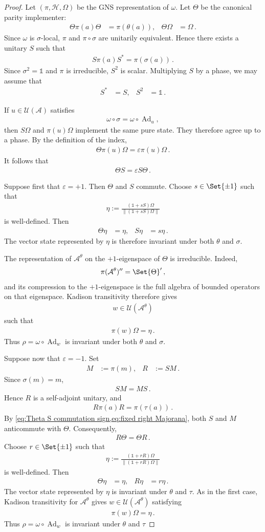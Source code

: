 \documentclass[a4paper,10pt]{article}
\numberwithin{equation}{section}
\theoremstyle{plain}
\theoremstyle{plain}
\theoremstyle{plain}
\theoremstyle{plain}
\theoremstyle{plain}
\theoremstyle{remark}
\theoremstyle{definition}
\newcommand{\calA}{\mathcal{A}}
\newcommand{\calU}{\mathcal{U}}
\newcommand{\calH}{\mathcal{H}}
\newcommand\norm[1]{\left\lVert#1\right\rVert}
\newcommand{\Ad}[1]{\operatorname{Ad}_{#1}}
\newcommand{\Id}{\mathds{1}}
\newcommand{\eq}[1]{\begin{align*}#1\end{align*}}
\newcommand{\eql}[1]{\begin{align}#1\end{align}}
\begin{document}
\begin{proof}
Let \((\pi,\calH,\Omega)\) be the GNS representation of \(\omega\).
Let \(\Theta\) be the canonical parity implementer:
\eq{
    \Theta\pi(a)\Theta
    &=
    \pi(\theta(a)),&
    \Theta\Omega
    &=
    \Omega\,.
}
Since \(\omega\) is \(\sigma\)-local, \(\pi\) and
\(\pi\circ\sigma\) are unitarily equivalent. Hence there exists a
unitary \(S\) such that
\eq{
    S\pi(a)S^*
    =
    \pi(\sigma(a))\,.
}
Since \(\sigma^2=\Id\) and \(\pi\) is irreducible, \(S^2\) is scalar.
Multiplying \(S\) by a phase, we may assume that
\eq{
    S^*
    &=
    S,&
    S^2
    &=
    \Id\,.
}

If \(u\in\calU(\calA)\) satisfies
\eq{
    \omega\circ\sigma
    =
    \omega\circ\Ad{u},
}
then \(S\Omega\) and \(\pi(u)\Omega\) implement the same pure state.
They therefore agree up to a phase. By the definition of the index,
\eq{
    \Theta\pi(u)\Omega
    =
    \varepsilon\pi(u)\Omega\,.
}
It follows that
\eql{
    \Theta S
    =
    \varepsilon S\Theta
    \label{eq:Theta S commutation sign}\,.
}

Suppose first that \(\varepsilon=+1\). Then \(\Theta\) and \(S\)
commute. Choose \(s\in\Set{\pm1}\) such that
\eq{
    \eta
    :=
    \frac{(\Id+sS)\Omega}
    {\norm{(\Id+sS)\Omega}}
}
is well-defined. Then
\eq{
    \Theta\eta
    &=
    \eta,&
    S\eta
    &=
    s\eta\,.
}
The vector state represented by \(\eta\) is therefore invariant under
both \(\theta\) and \(\sigma\).

The representation of \(\calA^\theta\) on the \(+1\)-eigenspace of
\(\Theta\) is irreducible. Indeed,
\eq{
    \pi(\calA^\theta)''
    =
    \Set{\Theta}'\, ,
}
and its compression to the \(+1\)-eigenspace is the full algebra of
bounded operators on that eigenspace. Kadison transitivity therefore
gives
\eq{
    w\in\calU(\calA^\theta)
}
such that
\eq{
    \pi(w)\Omega=\eta\,.
}
Thus \(\rho=\omega\circ\Ad{w}\) is invariant under both
\(\theta\) and \(\sigma\).

Suppose now that \(\varepsilon=-1\). Set
\eq{
    M
    &:=
    \pi(m),&
    R
    &:=
    SM\,.
}
Since \(\sigma(m)=m\),
\eq{
    SM=MS\,.
}
Hence \(R\) is a self-adjoint unitary, and
\eq{
    R\pi(a)R
    =
    \pi(\tau(a))\,.
}
By \cref{eq:Theta S commutation sign,eq:fixed right Majorana},
both \(S\) and \(M\) anticommute with \(\Theta\). Consequently,
\eq{
    R\Theta=\Theta R\,.
}
Choose \(r\in\Set{\pm1}\) such that
\eq{
    \eta
    :=
    \frac{(\Id+rR)\Omega}
    {\norm{(\Id+rR)\Omega}}
}
is well-defined. Then
\eq{
    \Theta\eta
    &=
    \eta,&
    R\eta
    &=
    r\eta\,.
}
The vector state represented by \(\eta\) is invariant under
\(\theta\) and \(\tau\). As in the first case, Kadison transitivity for
\(\calA^\theta\) gives \(w\in\calU(\calA^\theta)\) satisfying
\eq{
    \pi(w)\Omega=\eta\,.
}
Thus \(\rho=\omega\circ\Ad{w}\) is invariant under
\(\theta\) and \(\tau\)
\end{proof}
\end{document}
